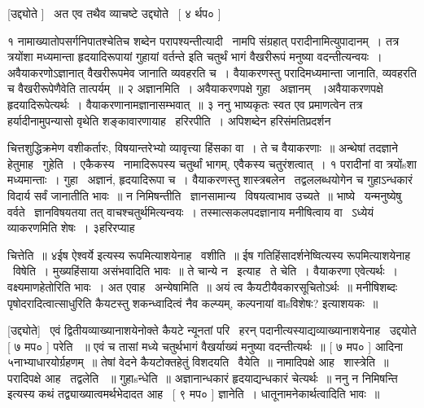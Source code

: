 \documentclass[11pt, openany]{book}
\begin{document}
 [उद्द्योते ] \textendash\ अत एव तथैव व्याचष्टे उद्द्योते \textendash\ [ ४ र्थप० ]



१ नामाख्यातोपसर्गनिपातश्चेतिच शब्देन परापश्यन्तीत्यादी \textendash\ नामपि संग्रहात्
परादीनामित्युपादानम्~। तत्र त्रयोंशा मध्यमान्ता हृदयादिरूपायां गुहायां
वर्तन्ते इति चतुर्थं भागं वैखरीरूपं मनुष्या वदन्तीत्यन्वयः~। 
अवैयाकरणोऽज्ञानात् वैखरीरूपमेव जानाति व्यवहरति च~। वैयाकरणस्तु
परादिमध्यमान्ता जानाति, व्यवहरति च वैखरीरूपेणैवेति तात्पर्यम्~॥ २
अज्ञानमिति~। अवैयाकरणपक्षे गुहा \textendash\ अज्ञानम् ~।अवैयाकरणपक्षे
हृदयादिरूपेत्यर्थः~। वैयाकरणानामज्ञानासम्भवात्~॥ ३ ननु भाष्यकृतः स्वत
एव प्रमाणत्वेन तत्र हर्यादीनामुपन्यासो वृथेति शङ्कावारणायाह \textendash\ हरिरपीति~। 
अपिशब्देन हरिसंमतिप्रदर्शन 





चित्तशुद्धिक्रमेण वशीकर्तारः, विषयान्तरेभ्यो व्यावृत्त्या हिंसका वा~। 
ते च वैयाकरणाः~॥ अन्थेषां तदज्ञाने हेतुमाह \textendash\ गुहेति~। 
एकैकस्य \textendash\ नामादिरूपस्य चतुर्थां भागम्, एवैकस्य चतुरंशत्वात्~। १ परादीनां वा
त्रयोंsशा मध्यमान्ताः~। गुहा \textendash\ अज्ञानं, हृदयादिरूपा च~। वैयाकरणस्तु
शास्त्रबलेन \textendash\ तद्वललब्धयोगेन च गुहाऽन्धकारं विदार्य सर्वं जानातीति भावः~॥
न निमिषन्तीति \textendash\ ज्ञानसामान्य \textendash\ विषयत्वाभाव उच्यते~॥ भाष्ये \textendash\ यन्मनुष्येषु
वर्वते \textendash\ ज्ञानविषयतया तत् वाचश्चतुर्थमित्यन्वयः~। तस्मात्सकलपदज्ञानाय
मनीषित्वाय वा \textendash\ ऽध्येयं व्याकरणमिति शेषः~। ३हरिरप्याह \textendash\ 



चित्तेति~॥ ४ईष ऐश्वर्ये इत्यस्य रूपमित्याशयेनाह \textendash\ वशीति~॥ ईष
गतिहिंसादर्शनेष्वित्यस्य रूपमित्याशयेनाह \textendash\ विषेति~। मुख्यहिंसाया
असंभवादिति भावः~॥ ते चान्ये न \textendash\ इत्याह \textendash\ ते चेति~। वैयाकरणा एवेत्यर्थः~। 
वक्ष्यमाणहेतोरिति भावः~। अत एवाह \textendash\ अन्येषामिति~॥ अयं त्व
कैयटीयैवकारसूचितोऽर्थः~॥ मनीषिशब्दः पृषोदरादित्वात्साधुरिति
कैयटस्तु {\qt शकन्ध्वादित्वं नैव कल्प्यम्, कल्पनायां वाsविशेषः?} इत्याशयकः~॥


 [उद्द्योते] \textendash\ एवं द्वितीयव्याख्यानाशयेनोक्ते कैयटे न्यूनतां
परि \textendash\ हरन् पदानीत्यस्याद्यव्याख्यानाशयेनाह \textendash\ उद्दयोते [ ७ मप० ] परेति
~॥ एवं च तासां मध्ये चतुर्थभागं वैखर्याख्यं मनुष्या वदन्तीत्यर्थः~॥ [
७ मप० ] आदिना ५नाभ्याधारयोर्ग्रहणम्~॥ तेषां वेदने कैयटोक्तहेतुं
विशदयति \textendash\ वैयेति~॥ नामादिपक्षे आह \textendash\ शास्त्रेति~॥ परादिपक्षे आह \textendash\ तद्वलेति
~॥ गुहाsन्धेति~॥ अज्ञानान्धकारं हृदयाद्यन्धकारं चेत्यर्थः~॥ ननु {\qt न
निमिषन्ति} इत्यस्य कथं तद्व्याख्यात्वमर्थभेदादत आह \textendash\ [ ९ मप० ]
ज्ञानेति~। धातूनामनेकार्थत्वादिति भावः~॥ 
\end{document}
